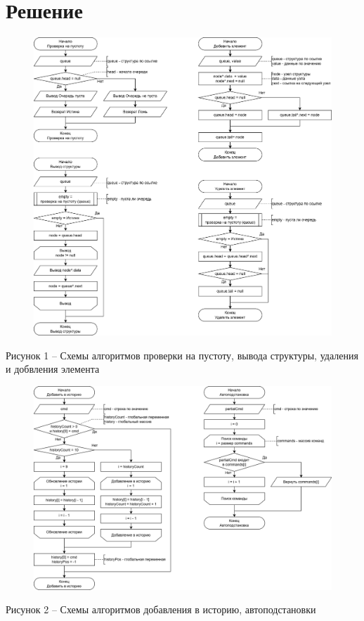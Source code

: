 \documentclass[a4paper,14pt]{extarticle}
\begin{document}
  \pagebreak
  \section*{Решение}

  \begin{figure}[h]
    \centering
    \includegraphics[width=1\linewidth]{images/s-1}
  \end{figure}
  \begin{center}
    Рисунок 1 – Схемы алгоритмов проверки на пустоту, вывода структуры, удаления и добвления элемента
  \end{center}

  \pagebreak

  \begin{figure}[h]
    \centering
    \includegraphics[width=1\linewidth]{images/s-2}
  \end{figure}
  \begin{center}
    Рисунок 2 – Схемы алгоритмов добавления в историю, автоподстановки
  \end{center}
\end{document}
